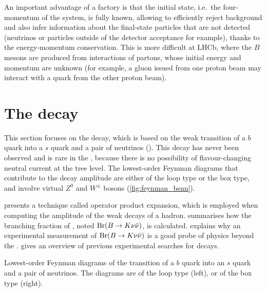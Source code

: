 An important advantage of a \B factory is that the initial state, i.e.~the four-momentum of the \epem system, is fully known, allowing to efficiently reject background and also infer information about the final-state particles that are not detected (neutrinos or particles outside of the detector acceptance for example), thanks to the energy-momentum conservation.
This is more difficult at LHCb, where the $B$ mesons are produced from interactions of partons, whose initial energy and momentum are unknown (for example, a gluon issued from one proton beam may interact with a quark from the other proton beam).

\section[The \BKnn decay]{The {\boldmath\BKnn} decay} \label{sec:bsnn_theory}
This section focuses on the \BKnn decay, which is based on the weak transition of a $b$ quark into a $s$ quark and a pair of neutrinos (\bsnn).
This decay has never been observed and is rare in the \SM, because there is no possibility of flavour-changing neutral current at the tree level.
The lowest-order Feynman diagrams that contribute to the decay amplitude are either of the loop type or the box type, and involve virtual $Z^0$ and $W^\pm$ bosons (\cref{fig:feynman_bsnn}).

 presents a technique called operator product expansion, which is employed when computing the amplitude of the weak decays of a hadron.
 summarises how the branching fraction of \BKnn, noted $\mathrm{\mathrm{Br}}(B\rightarrow K\nu\bar{\nu})$, is calculated.
 explains why an experimental measurement of $\mathrm{\mathrm{Br}}(B\rightarrow K\nu\bar{\nu})$ is a good probe of physics beyond the \SM.
 gives an overview of previous experimental searches for \BKnn decays.

{Lowest-order Feynman diagrams of the transition of a $b$ quark into an $s$ quark and a pair of neutrinos.
The diagrams are of the loop type (left), or of the box type (right).
}
